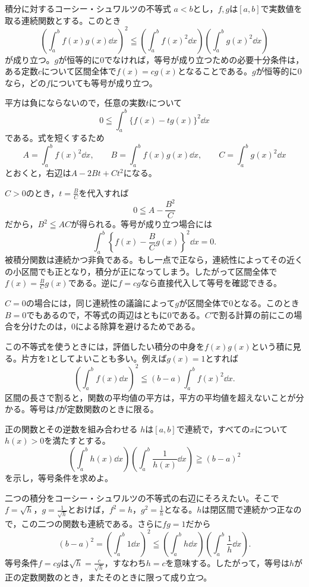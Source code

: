 \begin{theorem}{積分に対するコーシー・シュワルツの不等式}
$a<b$とし，$f,g$は$[a,b]$で実数値を取る連続関数とする。このとき
\begin{equation}\label{式:積分のコーシーシュワルツ}
 \left(\int_a^b f(x)g(x)\dd x\right)^2
 \leqq
 \left(\int_a^b f(x)^2\dd x\right)
 \left(\int_a^b g(x)^2\dd x\right)
\end{equation}
が成り立つ。$g$が恒等的に$0$でなければ，等号が成り立つための必要十分条件は，ある定数$c$について区間全体で$f(x)=cg(x)$となることである。$g$が恒等的に$0$なら，どの$f$についても等号が成り立つ。
\end{theorem}

平方は負にならないので，任意の実数$t$について
\[
 0\leqq\int_a^b\{f(x)-tg(x)\}^2\dd x
\]
である。式を短くするため
\[
 A=\int_a^b f(x)^2\dd x,\qquad
 B=\int_a^b f(x)g(x)\dd x,\qquad
 C=\int_a^b g(x)^2\dd x
\]
とおくと，右辺は$A-2Bt+Ct^2$になる。

$C>0$のとき，$t=\frac BC$を代入すれば
\[
 0\leqq A-\frac{B^2}{C}
\]
だから，$B^2\leqq AC$が得られる。等号が成り立つ場合には
\[
 \int_a^b\left\{f(x)-\frac BCg(x)\right\}^2\dd x=0.
\]
被積分関数は連続かつ非負である。もし一点で正なら，連続性によってその近くの小区間でも正となり，積分が正になってしまう。したがって区間全体で$f(x)=\frac BCg(x)$である。逆に$f=cg$なら直接代入して等号を確認できる。

$C=0$の場合には，同じ連続性の議論によって$g$が区間全体で$0$となる。このとき$B=0$でもあるので，不等式の両辺はともに$0$である。$C$で割る計算の前にこの場合を分けたのは，$0$による除算を避けるためである。

この不等式を使うときには，評価したい積分の中身を$f(x)g(x)$という積に見る。片方を$1$としてよいことも多い。例えば$g(x)=1$とすれば
\begin{equation}\label{式:平均と二乗平均}
 \left(\int_a^b f(x)\dd x\right)^2
 \leqq(b-a)\int_a^b f(x)^2\dd x.
\end{equation}
区間の長さで割ると，関数の平均値の平方は，平方の平均値を超えないことが分かる。等号は$f$が定数関数のときに限る。

\begin{example}{正の関数とその逆数を組み合わせる}
$h$は$[a,b]$で連続で，すべての$x$について$h(x)>0$を満たすとする。
\[
 \left(\int_a^b h(x)\dd x\right)
 \left(\int_a^b\frac1{h(x)}\dd x\right)
 \geqq(b-a)^2
\]
を示し，等号条件を求めよ。
\end{example}

二つの積分をコーシー・シュワルツの不等式の右辺にそろえたい。そこで$f=\sqrt h$，$g=\frac1{\sqrt h}$とおけば，$f^2=h$，$g^2=\frac1h$となる。$h$は閉区間で連続かつ正なので，この二つの関数も連続である。さらに$fg=1$だから
\[
 (b-a)^2=\left(\int_a^b1\dd x\right)^2
 \leqq\left(\int_a^b h\dd x\right)
       \left(\int_a^b\frac1h\dd x\right).
\]
等号条件$f=cg$は$\sqrt h=\frac c{\sqrt h}$，すなわち$h=c$を意味する。したがって，等号は$h$が正の定数関数のとき，またそのときに限って成り立つ。

